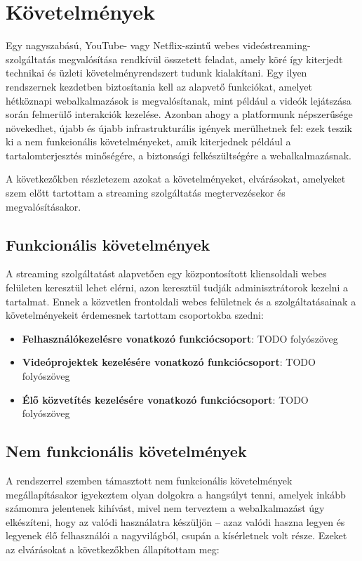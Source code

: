 \chapter{Követelmények}

Egy nagyszabású, YouTube- vagy Netflix-szintű webes videóstreaming-szolgáltatás megvalósítása rendkívül összetett feladat, amely köré így kiterjedt technikai és üzleti követelményrendszert tudunk kialakítani. Egy ilyen rendszernek kezdetben biztosítania kell az alapvető funkciókat, amelyet hétköznapi webalkalmazások is megvalósítanak, mint például a videók lejátszása során felmerülő interakciók kezelése. Azonban ahogy a platformunk népszerűsége növekedhet, újabb és újabb infrastrukturális igények merülhetnek fel: ezek teszik ki a nem funkcionális követelményeket, amik kiterjednek például a tartalomterjesztés minőségére, a biztonsági felkészültségére a webalkalmazásnak.

A következőkben részletezem azokat a követelményeket, elvárásokat, amelyeket szem előtt tartottam a streaming szolgáltatás megtervezésekor és megvalósításakor.

\section{Funkcionális követelmények}

A streaming szolgáltatást alapvetően egy központosított kliensoldali webes felületen keresztül lehet elérni, azon keresztül tudják adminisztrátorok kezelni a tartalmat. Ennek a közvetlen frontoldali webes felületnek és a szolgáltatásainak a követelményekeit érdemesnek tartottam csoportokba szedni:

\begin{itemize}
  \item \textbf{Felhasználókezelésre vonatkozó funkciócsoport}: TODO folyószöveg
  \item \textbf{Videóprojektek kezelésére vonatkozó funkciócsoport}: TODO folyószöveg
  \item \textbf{Élő közvetítés kezelésére vonatkozó funkciócsoport}: TODO folyószöveg
\end{itemize}

\section{Nem funkcionális követelmények}

A rendszerrel szemben támasztott nem funkcionális követelmények megállapításakor igyekeztem olyan dolgokra a hangsúlyt tenni, amelyek inkább számomra jelentenek kihívást, mivel nem terveztem a webalkalmazást úgy elkészíteni, hogy az valódi használatra készüljön -- azaz valódi haszna legyen és legyenek élő felhasználói a nagyvilágból, csupán a kísérletnek volt része. Ezeket az elvárásokat a következőkben állapítottam meg:

